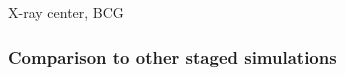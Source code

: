 
 
\cite{Cui2015} X-ray center, BCG
% 
% 
% 
\subsubsection{Comparison to other staged simulations}
% 
% 
% 
% 
% 
% 



% 
% 
% 
% 
% 
% 
% 
% 
% 
% 
% 
% 
% 

